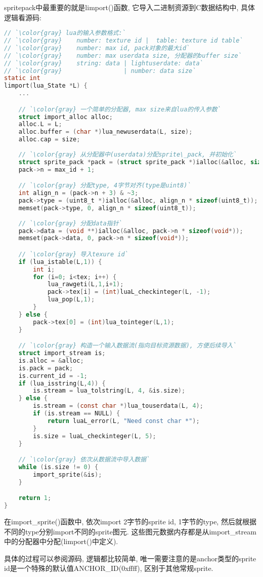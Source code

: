 {    {spritepack中最重要的就是limport()函数, 它导入二进制资源到C数据结构中, 具体逻辑看源码:}\par
\begin{lstlisting}[language=C]
// `\color{gray} lua的输入参数格式:`
// `\color{gray}    number: texture id |  table: texture id table`
// `\color{gray}    number: max id, pack对象的最大id`
// `\color{gray}    number: max userdata size, 分配器的buffer size`
// `\color{gray}    string: data | lightuserdate: data`
// `\color{gray}                 | number: data size`
static int
limport(lua_State *L) {
    ...

    // `\color{gray} 一个简单的分配器, max size来自lua的传入参数`
    struct import_alloc alloc;
    alloc.L = L;
    alloc.buffer = (char *)lua_newuserdata(L, size);
    alloc.cap = size;
   
    // `\color{gray} 从分配器中(userdata)分配sprite\_pack, 并初始化`
    struct sprite_pack *pack = (struct sprite_pack *)ialloc(&alloc, sizeof(*pack) + (tex - 1) * sizeof(int));
    pack->n = max_id + 1;

    // `\color{gray} 分配type, 4字节对齐(type是uint8)`
    int align_n = (pack->n + 3) & ~3;
    pack->type = (uint8_t *)ialloc(&alloc, align_n * sizeof(uint8_t));
    memset(pack->type, 0, align_n * sizeof(uint8_t));
    
    // `\color{gray} 分配data指针`
    pack->data = (void **)ialloc(&alloc, pack->n * sizeof(void*));
    memset(pack->data, 0, pack->n * sizeof(void*));

    // `\color{gray} 导入texure id`
    if (lua_istable(L,1)) {
        int i;
        for (i=0; i<tex; i++) {
            lua_rawgeti(L,1,i+1);
            pack->tex[i] = (int)luaL_checkinteger(L, -1);
            lua_pop(L,1);
        }
    } else {
        pack->tex[0] = (int)lua_tointeger(L,1);
    }

    // `\color{gray} 构造一个输入数据流(指向目标资源数据), 方便后续导入`
    struct import_stream is;
    is.alloc = &alloc;
    is.pack = pack;
    is.current_id = -1;
    if (lua_isstring(L,4)) {
        is.stream = lua_tolstring(L, 4, &is.size);
    } else {
        is.stream = (const char *)lua_touserdata(L, 4);
        if (is.stream == NULL) {
            return luaL_error(L, "Need const char *");
        }
        is.size = luaL_checkinteger(L, 5);
    }

    // `\color{gray} 依次从数据流中导入数据`
    while (is.size != 0) {
        import_sprite(&is);
    }

    return 1;
}
\end{lstlisting}

    {在import\_sprite()函数中, 依次import 2字节的sprite id, 1字节的type, 然后就根据不同的type分别import不同的sprite图元. 这些图元数据内存都是从import\_stream中的分配器中分配(limport()中定义). }\par
    {具体的过程可以参阅源码, 逻辑都比较简单, 唯一需要注意的是anchor类型的sprite id是一个特殊的默认值ANCHOR\_ID(0xffff), 区别于其他常规sprite. }\par
}

